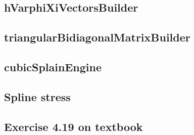 \subsection{hVarphiXiVectorsBuilder}
\label{subsec:hVarphiXiVectorsBuilder}


\subsection{triangularBidiagonalMatrixBuilder}
\label{subsec:triangularBidiagonalMatrixBuilder}


\subsection{cubicSplainEngine}
\label{subsec:cubicSplainEngine}


\subsection{Spline stress}
\label{subsec:splineStress}


\subsection{Exercise 4.19 on textbook}
\label{subsec:exercise419}
